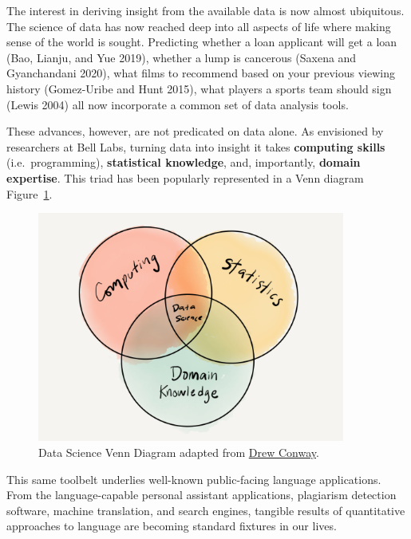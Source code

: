 \documentclass[
  letterpaper,
]{latex/krantz}
\begin{document}
The interest in deriving insight from the available data is now almost
ubiquitous. The science of data has now reached deep into all aspects of
life where making sense of the world is sought. Predicting whether a
loan applicant will get a loan (Bao, Lianju, and Yue 2019), whether a
lump is cancerous (Saxena and Gyanchandani 2020), what films to
recommend based on your previous viewing history (Gomez-Uribe and Hunt
2015), what players a sports team should sign (Lewis 2004) all now
incorporate a common set of data analysis tools.

These advances, however, are not predicated on data alone. As envisioned
by researchers at Bell Labs, turning data into insight it takes
\textbf{computing skills} (i.e.~programming), \textbf{statistical
knowledge}, and, importantly, \textbf{domain expertise}. This triad has
been popularly represented in a Venn diagram
Figure~\ref{fig-intro-data-science-venn}.

\begin{figure}

{\centering \includegraphics[width=0.9\textwidth,height=\textheight]{./figures/text-analysis/data-science-venn-paper.png}

}

\caption{\label{fig-intro-data-science-venn}Data Science Venn Diagram
adapted from
\href{http://drewconway.com/zia/2013/3/26/the-data-science-venn-diagram}{Drew
Conway}.}

\end{figure}

This same toolbelt underlies well-known public-facing language
applications. From the language-capable personal assistant applications,
plagiarism detection software, machine translation, and search engines,
tangible results of quantitative approaches to language are becoming
standard fixtures in our lives.
\end{document}
